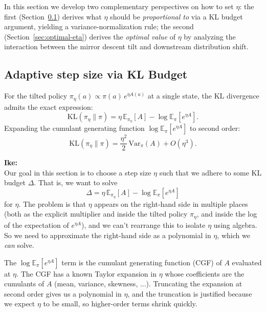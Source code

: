 \documentclass[11pt]{article}
\theoremstyle{definition}
\theoremstyle{remark}
\newenvironment{ike}{\color{blue}\textbf{Ike:}\\}{}
\newcommand{\KL}{\mathrm{KL}}
\newcommand{\Var}{\mathrm{Var}}
\newcommand{\E}{\mathbb{E}}
\begin{document}
In this section we develop two complementary perspectives on how to set $\eta$: the first (Section~\ref{sec:kl-budget}) derives what $\eta$ should be \emph{proportional to} via a KL budget argument, yielding a variance-normalization rule; the second (Section~\ref{sec:optimal-eta}) derives the \emph{optimal value} of $\eta$ by analyzing the interaction between the mirror descent tilt and downstream distribution shift.

\subsection{Adaptive step size via KL Budget}
\label{sec:kl-budget}

For the tilted policy $\pi_\eta(a) \propto \pi(a)\,e^{\eta A(a)}$ at a single state, the KL divergence admits the exact expression:
\[
  \KL(\pi_\eta \| \pi) = \eta\,\E_{\pi_\eta}[A] - \log \E_\pi[e^{\eta A}].
\]
Expanding the cumulant generating function $\log \E_\pi[e^{\eta A}]$ to second order:
\begin{equation}\label{eq:kl-expansion}
  \KL(\pi_\eta \| \pi) = \frac{\eta^2}{2}\,\Var_\pi(A) + O(\eta^3).
\end{equation}

\begin{ike}
    Our goal in this section is to choose a step size $\eta$ such that we adhere to some KL budget $\Delta$. That is, we want to solve
    \[
    \Delta = \eta \, \mathbb{E}_{\pi_\eta}[A] - \log \mathbb{E}_\pi[e^{\eta A}]
    \]
    for $\eta$. The problem is that $\eta$ appears on the right-hand side in multiple places (both as the explicit multiplier and inside the tilted policy $\pi_\eta$, and inside the log of the expectation of $e^{\eta A}$), and we can't rearrange this to isolate $\eta$ using algebra. So we need to approximate the right-hand side as a polynomial in $\eta$, which we \emph{can} solve.
    
    The $\log \mathbb{E}_\pi[e^{\eta A}]$ term is the cumulant generating function (CGF) of $A$ evaluated at $\eta$. The CGF has a known Taylor expansion in $\eta$ whose coefficients are the cumulants of $A$ (mean, variance, skewness, ...). Truncating the expansion at second order gives us a polynomial in $\eta$, and the truncation is justified because we expect $\eta$ to be small, so higher-order terms shrink quickly.
\end{ike}
\end{document}
